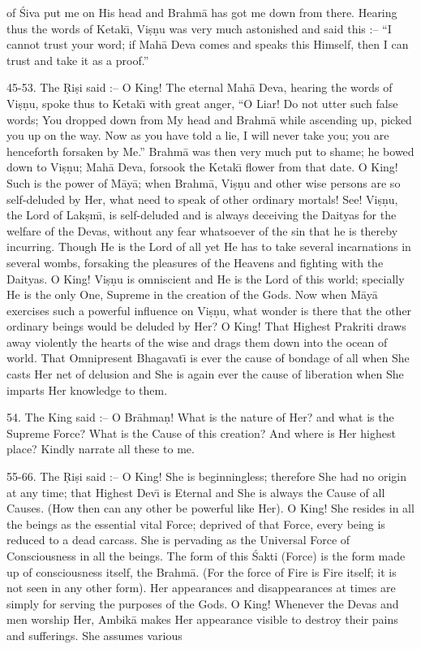 of \'Siva put me on His head and Brahm\=a has got me down from there. Hearing thus the words of Ketak\={\i}, Vi\d{s}\d{n}u was very much astonished and said this :-- ``I cannot trust your word; if Mah\=a Deva comes and speaks this Himself, then I can trust and take it as a proof.''

45-53. The \d{R}i\d{s}i said :-- O King! The eternal Mah\=a Deva, hearing the words of Vi\d{s}\d{n}u, spoke thus to Ketak\={\i} with great anger, ``O Liar! Do not utter such false words; You dropped down from My head and Brahm\=a while ascending up, picked you up on the way. Now as you have told a lie, I will never take you; you are henceforth forsaken by Me.'' Brahm\=a was then very much put to shame; he bowed down to Vi\d{s}\d{n}u; Mah\=a Deva, forsook the Ketak\={\i} flower from that date. O King! Such is the power of M\=ay\=a; when Brahm\=a, Vi\d{s}\d{n}u and other wise persons are so self-deluded by Her, what need to speak of other ordinary mortals! See! Vi\d{s}\d{n}u, the Lord of Lak\d{s}m\={\i}, is self-deluded and is always deceiving the Daityas for the welfare of the Devas, without any fear whatsoever of the sin that he is thereby incurring. Though He is the Lord of all yet He has to take several incarnations in several wombs, forsaking the pleasures of the Heavens and fighting with the Daityas. O King! Vi\d{s}\d{n}u is omniscient and He is the Lord of this world; specially He is the only One, Supreme in the creation of the Gods. Now when M\=ay\=a exercises such a powerful influence on Vi\d{s}\d{n}u, what wonder is there that the other ordinary beings would be deluded by Her? O King! That Highest Prakriti draws away violently the hearts of the wise and drags them down into the ocean of world. That Omnipresent Bhagavat\={\i} is ever the cause of bondage of all when She casts Her net of delusion and She is again ever the cause of liberation when She imparts Her knowledge to them.

54. The King said :-- O Br\=ahma\d{n}! What is the nature of Her? and what is the Supreme Force? What is the Cause of this creation? And where is Her highest place? Kindly narrate all these to me.

55-66. The \d{R}i\d{s}i said :-- O King! She is beginningless; therefore She had no origin at any time; that Highest Dev\={\i} is Eternal and She is always the Cause of all Causes. (How then can any other be powerful like Her). O King! She resides in all the beings as the essential vital Force; deprived of that Force, every being is reduced to a dead carcass. She is pervading as the Universal Force of Consciousness in all the beings. The form of this \'Sakti (Force) is the form made up of consciousness itself, the Brahm\=a. (For the force of Fire is Fire itself; it is not seen in any other form). Her appearances and disappearances at times are simply for serving the purposes of the Gods. O King! Whenever the Devas and men worship Her, Ambik\=a makes Her appearance visible to destroy their pains and sufferings. She assumes various


